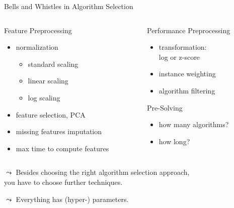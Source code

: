 \begin{frame}[c]{Bells and Whistles in Algorithm Selection}

\begin{columns}
	\begin{column}{0.45\textwidth}
		\begin{block}{Feature Preprocessing}
		\begin{itemize}
		  \item normalization
		  \begin{itemize}
		    \item standard scaling
		    \item linear scaling
		    \item log scaling
		  \end{itemize}
		  \item feature selection, PCA
		  \item missing features imputation
		  \item max time to compute features
		\end{itemize}
		\end{block}
	\end{column}
	\begin{column}{0.45\textwidth}
		\begin{block}{Performance Preprocessing}
		\begin{itemize}
		  \item transformation:\\ log or z-score
		  \item instance weighting
		  \item algorithm filtering
		\end{itemize}
		\end{block}
		\begin{block}{Pre-Solving}
			\begin{itemize}
			  \item how many algorithms?
			  \item how long?
			\end{itemize}
		\end{block}
	\end{column}

\end{columns}


\bigskip
\pause

$\leadsto$ Besides choosing the right algorithm selection approach,\\
you have to choose further techniques.

\pause

$\leadsto$ Everything has (hyper-) parameters.

\end{frame}
